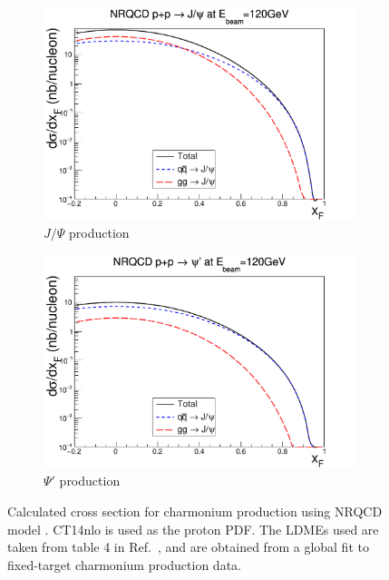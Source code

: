 \begin{figure}[h!]
    \centering
    \begin{subfigure}{0.45\linewidth}
    \includegraphics[width=\linewidth]{images/jpsi_cs_pp}
    \caption{$J/\Psi$ production}
    \end{subfigure}
    \quad
    \begin{subfigure}{0.45\linewidth}
    \includegraphics[width=\linewidth]{images/psip_cs_pp}
    \caption{$\Psi'$ production}
    \end{subfigure}
    \caption{Calculated cross section for charmonium production using NRQCD model \cite{chang2021}.
		CT14nlo is used as the proton PDF. The LDMEs used are taken from table 4 
		in Ref.\ \cite{hsieh2021}, and are obtained from a global fit to fixed-target charmonium production data. }
    \label{fig:NRQCD_cs}
\end{figure}


